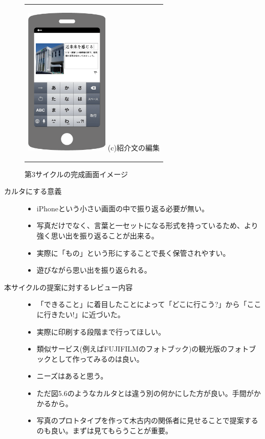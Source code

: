 \begin{figure}[htbp]
\begin{center}
\begin{tabular}{c}
      \begin{minipage}{0.33\hsize}
        \begin{center}
\includegraphics[width=4cm, bb=0 0 320 548]{画面案3.png}
          \hspace{1cm} (c)紹介文の編集
        \end{center}
      \end{minipage}

    \end{tabular}
    \caption{第3サイクルの完成画面イメージ}
    \label{fig:lena}
  \end{center}
\end{figure}

\begin{description}
\item[カルタにする意義]\mbox{}
 \begin{itemize}
 \item iPhoneという小さい画面の中で振り返る必要が無い。
 \item 写真だけでなく、言葉と一セットになる形式を持っているため、より強く思い出を振り返ることが出来る。
 \item 実際に「もの」という形にすることで長く保管されやすい。
 \item 遊びながら思い出を振り返られる。
 \end{itemize}
\item[本サイクルの提案に対するレビュー内容]\mbox{}
 \begin{itemize}
 \item 「できること」に着目したことによって「どこに行こう?」から「ここに行きたい!」に近づいた。
 \item 実際に印刷する段階まで行ってほしい。
 \item 類似サービス(例えばFUJIFILMのフォトブック)の観光版のフォトブックとして作ってみるのは良い。
 \item ニーズはあると思う。
 \item ただ図5.6のようなカルタとは違う別の何かにした方が良い。手間がかかるから。
 \item 写真のプロトタイプを作って木古内の関係者に見せることで提案するのも良い。まずは見てもらうことが重要。
 \end{itemize}
\end{description}

